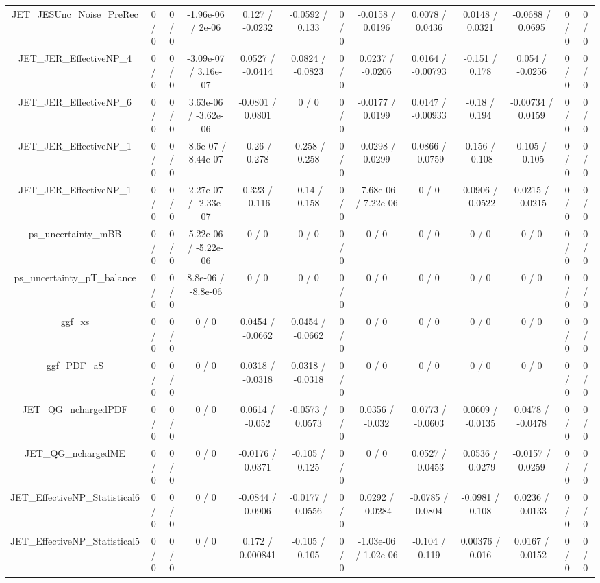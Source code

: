 \documentclass[10pt]{article}
\begin{document}
\begin{table}[htbp]
\begin{center}
\begin{tabular}{|c|c|c|c|c|c|c|c|c|c|c|c|c|}
  JET_JESUnc_Noise_PreRec & 0 / 0 & 0 / 0 & -1.96e-06 / 2e-06 & 0.127 / -0.0232 & -0.0592 / 0.133 & 0 / 0 & -0.0158 / 0.0196 & 0.0078 / 0.0436 & 0.0148 / 0.0321 & -0.0688 / 0.0695 & 0 / 0 & 0 / 0 \\ 
  JET_JER_EffectiveNP_4 & 0 / 0 & 0 / 0 & -3.09e-07 / 3.16e-07 & 0.0527 / -0.0414 & 0.0824 / -0.0823 & 0 / 0 & 0.0237 / -0.0206 & 0.0164 / -0.00793 & -0.151 / 0.178 & 0.054 / -0.0256 & 0 / 0 & 0 / 0 \\ 
  JET_JER_EffectiveNP_6 & 0 / 0 & 0 / 0 & 3.63e-06 / -3.62e-06 & -0.0801 / 0.0801 & 0 / 0 & 0 / 0 & -0.0177 / 0.0199 & 0.0147 / -0.00933 & -0.18 / 0.194 & -0.00734 / 0.0159 & 0 / 0 & 0 / 0 \\ 
  JET_JER_EffectiveNP_1 & 0 / 0 & 0 / 0 & -8.6e-07 / 8.44e-07 & -0.26 / 0.278 & -0.258 / 0.258 & 0 / 0 & -0.0298 / 0.0299 & 0.0866 / -0.0759 & 0.156 / -0.108 & 0.105 / -0.105 & 0 / 0 & 0 / 0 \\ 
  JET_JER_EffectiveNP_1 & 0 / 0 & 0 / 0 & 2.27e-07 / -2.33e-07 & 0.323 / -0.116 & -0.14 / 0.158 & 0 / 0 & -7.68e-06 / 7.22e-06 & 0 / 0 & 0.0906 / -0.0522 & 0.0215 / -0.0215 & 0 / 0 & 0 / 0 \\ 
  ps_uncertainty_mBB & 0 / 0 & 0 / 0 & 5.22e-06 / -5.22e-06 & 0 / 0 & 0 / 0 & 0 / 0 & 0 / 0 & 0 / 0 & 0 / 0 & 0 / 0 & 0 / 0 & 0 / 0 \\ 
  ps_uncertainty_pT_balance & 0 / 0 & 0 / 0 & 8.8e-06 / -8.8e-06 & 0 / 0 & 0 / 0 & 0 / 0 & 0 / 0 & 0 / 0 & 0 / 0 & 0 / 0 & 0 / 0 & 0 / 0 \\ 
  ggf_xs & 0 / 0 & 0 / 0 & 0 / 0 & 0.0454 / -0.0662 & 0.0454 / -0.0662 & 0 / 0 & 0 / 0 & 0 / 0 & 0 / 0 & 0 / 0 & 0 / 0 & 0 / 0 \\ 
  ggf_PDF_aS & 0 / 0 & 0 / 0 & 0 / 0 & 0.0318 / -0.0318 & 0.0318 / -0.0318 & 0 / 0 & 0 / 0 & 0 / 0 & 0 / 0 & 0 / 0 & 0 / 0 & 0 / 0 \\ 
  JET_QG_nchargedPDF & 0 / 0 & 0 / 0 & 0 / 0 & 0.0614 / -0.052 & -0.0573 / 0.0573 & 0 / 0 & 0.0356 / -0.032 & 0.0773 / -0.0603 & 0.0609 / -0.0135 & 0.0478 / -0.0478 & 0 / 0 & 0 / 0 \\ 
  JET_QG_nchargedME & 0 / 0 & 0 / 0 & 0 / 0 & -0.0176 / 0.0371 & -0.105 / 0.125 & 0 / 0 & 0 / 0 & 0.0527 / -0.0453 & 0.0536 / -0.0279 & -0.0157 / 0.0259 & 0 / 0 & 0 / 0 \\ 
  JET_EffectiveNP_Statistical6 & 0 / 0 & 0 / 0 & 0 / 0 & -0.0844 / 0.0906 & -0.0177 / 0.0556 & 0 / 0 & 0.0292 / -0.0284 & -0.0785 / 0.0804 & -0.0981 / 0.108 & 0.0236 / -0.0133 & 0 / 0 & 0 / 0 \\ 
  JET_EffectiveNP_Statistical5 & 0 / 0 & 0 / 0 & 0 / 0 & 0.172 / 0.000841 & -0.105 / 0.105 & 0 / 0 & -1.03e-06 / 1.02e-06 & -0.104 / 0.119 & 0.00376 / 0.016 & 0.0167 / -0.0152 & 0 / 0 & 0 / 0 \\ 

\end{tabular}
\end{center}
\end{table}
\end{document}
